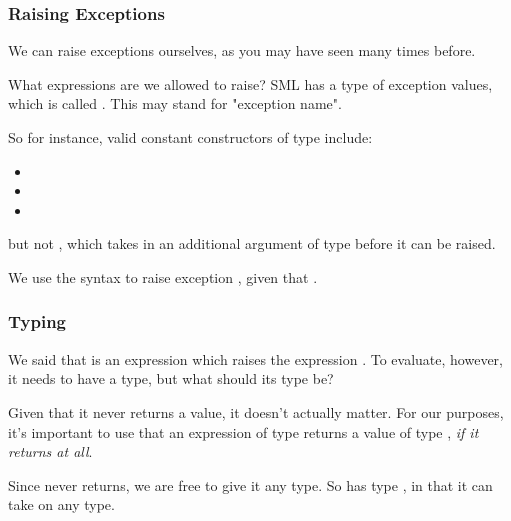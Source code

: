 \documentclass[aspectratio=169, handout]{beamer}
\begin{document}
\begin{frame}[fragile]
  \frametitle{Raising Exceptions}

  We can raise exceptions ourselves, as you may have seen many times before.

  \pause
  \vspace{\fill}

  What expressions are we allowed to raise? SML has a type of exception values,
  which is called . This may stand for "exception name".

  \pause
  \vspace{\fill}

  So for instance, valid constant constructors of type  include:
  \begin{itemize}
    \item {}
    \item {}
    \item {}
  \end{itemize}

  \pause
  but not , which takes in an additional argument
  of type  before it can be raised.

  \pause
  \vspace{\fill}

  We use the syntax  to raise exception , given that
  .

  \pause
  \vspace{\fill}

\end{frame}

\begin{frame}[fragile]
  \frametitle{Typing }

  We said that  is an expression which raises the expression
  . To evaluate, however, it needs to have a type, but what should
  its type be?

  \pause
  \vspace{\fill}

  Given that it never returns a value, it doesn't actually matter. For our
  purposes, it's important to use that an expression of type 
  returns a value of type , \textit{if it returns at all}.

  \pause
  \vspace{\fill}

  Since  never returns, we are free to give it any type. So
   has type , in that it can take on any type.
\end{frame}
\end{document}
